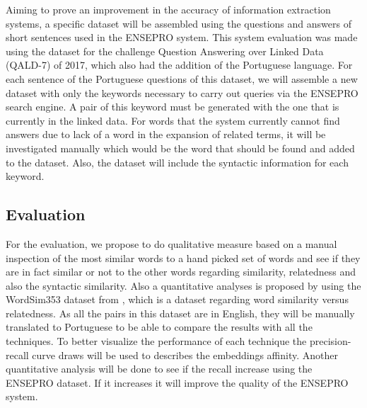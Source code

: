 Aiming to prove an improvement in the accuracy of information extraction systems, a specific dataset will be assembled using the questions and answers of short sentences used in the ENSEPRO system. This system evaluation was made using the dataset for the challenge Question Answering over Linked Data (QALD-7) of 2017, which also had the addition of the Portuguese language. For each sentence of the Portuguese questions of this dataset, we will assemble a new dataset with only the keywords necessary to carry out queries via the ENSEPRO search engine. A pair of this keyword must be generated with the one that is currently in the linked data. For words that the system currently cannot find answers due to lack of a word in the expansion of related terms, it will be investigated manually which would be the word that should be found and added to the dataset. Also, the dataset will include the syntactic information for each keyword.

\subsection{Evaluation}\label{chap:methodsandmaterials:evaluation}

For the evaluation, we propose to do qualitative measure based on a manual inspection of the most similar words to a hand picked set of words and see if they are in fact similar or not to the other words regarding similarity, relatedness and also the syntactic similarity.
Also a quantitative analyses is proposed by using the WordSim353 dataset from , which is a dataset regarding word similarity versus relatedness. As all the pairs in this dataset are in English, they will be manually translated to Portuguese to be able to compare the results with all the techniques.
To better visualize the performance of each technique the precision-recall curve draws will be used to describes the embeddings affinity.
Another quantitative analysis will be done to see if the recall increase using the ENSEPRO dataset. If it increases it will improve the quality of the ENSEPRO system. 





















